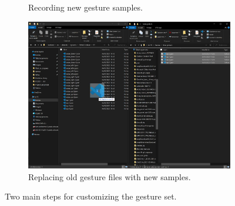 \begin{figure}[p]
    \centering
    
    \begin{subfigure}{.90\textwidth}
        \centering
        \captionsetup{width=.99\linewidth}
        \vspace{-2pt}
        \caption{Recording new gesture samples.}
        \label{fig:lui:customization-steps:record}
    \end{subfigure}
    \vspace{2pt}
    
    \begin{subfigure}{.90\textwidth}
        \centering
        \includegraphics[width=.99\linewidth]{Figures/LUI/Customization/files.pdf}  
        \vspace{-2pt}
        \captionsetup{width=.99\linewidth}
        \caption{Replacing old gesture files with new samples.}
        \label{fig:lui:customization-steps:files}
    \end{subfigure}
    \vspace{-6pt}
    \caption{Two main steps for customizing the \lui gesture set.}
    \label{fig:lui:customization-steps}
\end{figure}

